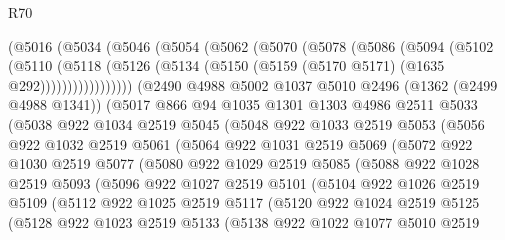 \begin{lexlean}{R70}
\begin{coremodule}
      (@5016
        (@5034
          (@5046
            (@5054
              (@5062
                (@5070
                  (@5078
                    (@5086
                      (@5094
                        (@5102
                          (@5110
                            (@5118
                              (@5126 (@5134 (@5150 (@5159 (@5170 @5171) (@1635 @292)))))))))))))))))
      (@2490
        @4988
        @5002
        @1037
        @5010
        @2496
        (@1362 (@2499 @4988 @1341))
        (@5017
          @866
          @94
          @1035
          @1301
          @1303
          @4986
          @2511
          @5033
          (@5038
            @922
            @1034
            @2519
            @5045
            (@5048
              @922
              @1033
              @2519
              @5053
              (@5056
                @922
                @1032
                @2519
                @5061
                (@5064
                  @922
                  @1031
                  @2519
                  @5069
                  (@5072
                    @922
                    @1030
                    @2519
                    @5077
                    (@5080
                      @922
                      @1029
                      @2519
                      @5085
                      (@5088
                        @922
                        @1028
                        @2519
                        @5093
                        (@5096
                          @922
                          @1027
                          @2519
                          @5101
                          (@5104
                            @922
                            @1026
                            @2519
                            @5109
                            (@5112
                              @922
                              @1025
                              @2519
                              @5117
                              (@5120
                                @922
                                @1024
                                @2519
                                @5125
                                (@5128
                                  @922
                                  @1023
                                  @2519
                                  @5133
                                  (@5138
                                    @922
                                    @1022
                                    @1077
                                    @5010
                                    @2519

\end{coremodule}
\end{lexlean}

